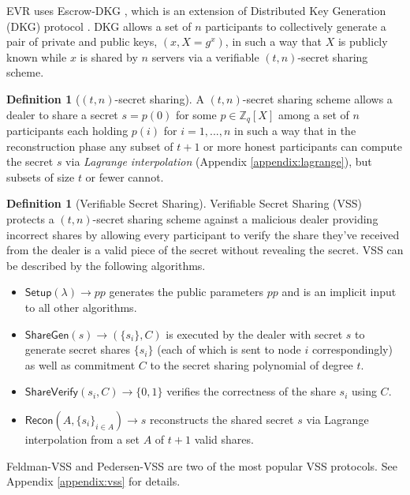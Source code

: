 \documentclass[letterpaper,twocolumn,10pt]{article}
\theoremstyle{definition}
\newtheorem{definition}[theorem]{Definition}
\theoremstyle{remark}
\begin{document}
EVR uses Escrow-DKG \cite{david2019rational}, which is an extension of Distributed Key Generation (DKG) protocol \cite{gennaro1999secure, gennaro3revisiting}. DKG allows a set of $n$ participants to collectively generate a pair of private and public keys, $(x,X = g^x )$, in such a way that $X$ is publicly known while $x$ is shared by $n$ servers via a verifiable $(t, n)$-secret sharing scheme.

\begin{definition}[$(t, n)$-secret sharing]
A $(t, n)$-secret sharing scheme \cite{shamir1979share, blakley1979safeguarding} allows a dealer to share a secret $s = p(0)$ for some $p \in \mathbb{Z}_q[X]$ among a set of $n$ participants each holding $p(i)$ for $i = 1, ..., n$ in such a way that in the reconstruction phase any subset of $t+1$ or more honest participants can compute the secret $s$ via \textit{Lagrange interpolation} (Appendix \ref{appendix:lagrange}), but subsets of size $t$ or fewer cannot.
\end{definition}

\begin{definition}[Verifiable Secret Sharing]
Verifiable Secret Sharing (VSS) \cite{feldman1987practical, pedersen1991non} protects a $(t, n)$-secret sharing scheme against a malicious dealer providing incorrect shares by allowing every participant to verify the share they've received from the dealer is a valid piece of the secret without revealing the secret. VSS can be described by the following algorithms.
\begin{itemize}
    \item $\mathsf{Setup}(\lambda) \rightarrow pp$ generates the public parameters $pp$ and is an implicit input to all other algorithms.
    \item $\mathsf{ShareGen}(s) \rightarrow (\{s_i\}, C)$ is executed by the dealer with secret $s$ to generate secret shares $\{s_i\}$ (each of which is sent to node $i$ correspondingly) as well as commitment $C$ to the secret sharing polynomial of degree $t$.
    \item $\mathsf{ShareVerify}(s_i, C) \rightarrow \{0, 1\}$ verifies the correctness of the share $s_i$ using $C$.
    \item $\mathsf{Recon}(A, \{s_i\}_{i \in A}) \rightarrow s$ reconstructs the shared secret $s$ via Lagrange interpolation from a set $A$ of $t + 1$ valid shares.
\end{itemize}
Feldman-VSS and Pedersen-VSS are two of the most popular VSS protocols. See Appendix \ref{appendix:vss} for details.
\end{definition}
\end{document}
